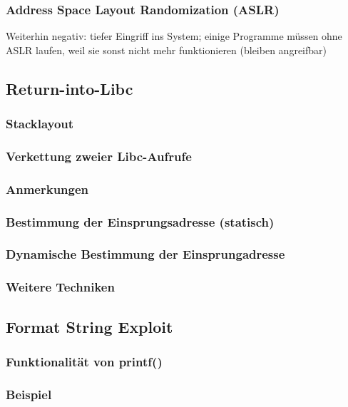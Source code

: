 \subsubsection{Address Space Layout Randomization (ASLR)}
Weiterhin negativ: tiefer Eingriff ins System; einige Programme müssen ohne ASLR laufen, weil sie sonst nicht mehr funktionieren (bleiben angreifbar)

\subsection{Return-into-Libc}
\subsubsection*{Stacklayout}
\subsubsection*{Verkettung zweier Libc-Aufrufe}
\subsubsection*{Anmerkungen}
\subsubsection{Bestimmung der Einsprungsadresse (statisch)}
\subsubsection{Dynamische Bestimmung der Einsprungadresse}
\subsubsection{Weitere Techniken}


\subsection{Format String Exploit}
\subsubsection{Funktionalität von printf()}
\subsubsection*{Beispiel}
